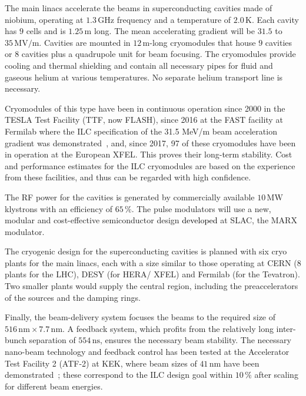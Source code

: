 \documentclass[%
 reprint,
 floatfix,
 amsmath,amssymb,
 aps,
]{revtex4-1}
\newcommand{\jim}[1]{\textcolor{black}{#1}}
\begin{document}
The main linacs accelerate the beams in superconducting cavities made of niobium, operating at $1.3\,{\mathrm{GHz}}$ frequency and a temperature of $2.0\,{\mathrm{K}}$. 
Each cavity has $9$ cells and is $1.25\,{\mathrm{m}}$ long. 
The mean accelerating gradient will be $31.5$ to $35\,{\mathrm{MV/m}}$.
Cavities are mounted in $12\,{\mathrm{m}}$-long cryomodules that house $9$ cavities or $8$ cavities plus a quadrupole unit for beam focusing. 
The cryomodules provide cooling and thermal shielding and contain all
necessary pipes for fluid and gaseous helium at various temperatures. 
No separate helium transport line is necessary.

Cryomodules of this type have been in continuous operation since 2000 in the TESLA Test Facility (TTF, now FLASH), since 2016 at the FAST facility at Fermilab where the ILC specification of the 31.5 MeV/m beam acceleration gradient was demonstrated~\cite{Broemmelsiek:2018iqr},  and, since 2017, 97 of these cryomodules have been in operation at the European XFEL.
This proves their 
long-term stability. 
Cost and performance estimates for the ILC cryomodules are based on
the 
experience from these facilities, and thus can be regarded with high confidence. 

The RF power for the cavities is generated by commercially available $10\,{\mathrm{MW}}$ klystrons with an efficiency of $65\,\%$. 
The pulse modulators will use a new, modular and cost-effective semiconductor design \jim{developed} at SLAC, the MARX modulator.

The cryogenic design for the superconducting cavities is planned with six cryo plants for the
main linacs, each with a size similar to those operating at CERN (8
plants for the LHC), 
DESY (for HERA/ XFEL) and Fermilab (for the Tevatron).
Two smaller plants would supply the central region, including the preaccelerators of the sources and the damping rings. 

Finally, the beam-delivery system focuses the beams 
to the required size of $516\,{\mathrm{nm}} \times 7.7\,{\mathrm{nm}} $. 
A feedback system, which profits from the relatively long
 inter-bunch separation of $554\,{\mathrm{ns}}$, ensures the necessary beam stability. 
The necessary nano-beam technology and feedback control has been tested at the Accelerator Test Facility 2 (ATF-2) at KEK, where beam sizes of $41\,{\mathrm{nm}}$ have been demonstrated~\cite{Okugi:2017jji}; these correspond to the ILC design goal within $10\,\%$ after scaling for different beam energies.
 
\end{document}
